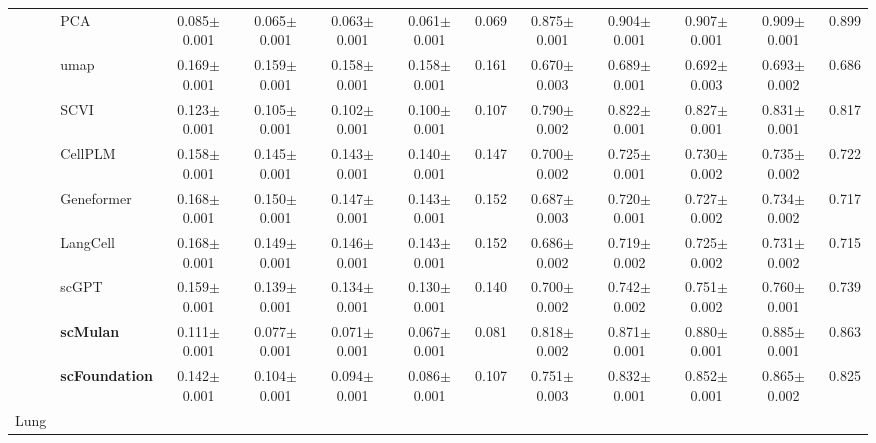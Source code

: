 \begin{table}[htbp]
\begin{tabular}{cl|ccccc|ccccc}
    & PCA      & \cellcolor{gray!25}0.085$\pm$0.001 & \cellcolor{gray!25}0.065$\pm$0.001 & \cellcolor{gray!25}0.063$\pm$0.001 & \cellcolor{gray!25}0.061$\pm$0.001 & \cellcolor{gray!25}0.069      & \cellcolor{gray!25}0.875$\pm$0.001 & \cellcolor{gray!25}0.904$\pm$0.001 & \cellcolor{gray!25}0.907$\pm$0.001 & \cellcolor{gray!25}0.909$\pm$0.001 & \cellcolor{gray!25}0.899 \\
    & umap      & 0.169$\pm$0.001 & 0.159$\pm$0.001 & 0.158$\pm$0.001 & 0.158$\pm$0.001 & 0.161      & 0.670$\pm$0.003 & 0.689$\pm$0.001 & 0.692$\pm$0.003 & 0.693$\pm$0.002 & 0.686 \\
    & SCVI      & 0.123$\pm$0.001 & 0.105$\pm$0.001 & 0.102$\pm$0.001 & 0.100$\pm$0.001 & 0.107      & 0.790$\pm$0.002 & 0.822$\pm$0.001 & 0.827$\pm$0.001 & 0.831$\pm$0.001 & 0.817 \\
    & CellPLM      & 0.158$\pm$0.001 & 0.145$\pm$0.001 & 0.143$\pm$0.001 & 0.140$\pm$0.001 & 0.147      & 0.700$\pm$0.002 & 0.725$\pm$0.001 & 0.730$\pm$0.002 & 0.735$\pm$0.002 & 0.722 \\
    & Geneformer      & 0.168$\pm$0.001 & 0.150$\pm$0.001 & 0.147$\pm$0.001 & 0.143$\pm$0.001 & 0.152      & 0.687$\pm$0.003 & 0.720$\pm$0.001 & 0.727$\pm$0.002 & 0.734$\pm$0.002 & 0.717 \\
    & LangCell      & 0.168$\pm$0.001 & 0.149$\pm$0.001 & 0.146$\pm$0.001 & 0.143$\pm$0.001 & 0.152      & 0.686$\pm$0.002 & 0.719$\pm$0.002 & 0.725$\pm$0.002 & 0.731$\pm$0.002 & 0.715 \\
    & scGPT      & 0.159$\pm$0.001 & 0.139$\pm$0.001 & 0.134$\pm$0.001 & 0.130$\pm$0.001 & 0.140      & 0.700$\pm$0.002 & 0.742$\pm$0.002 & 0.751$\pm$0.002 & 0.760$\pm$0.001 & 0.739 \\
    & \cellcolor{gray!25}\textbf{scMulan}      & 0.111$\pm$0.001 & 0.077$\pm$0.001 & 0.071$\pm$0.001 & 0.067$\pm$0.001 & 0.081      & 0.818$\pm$0.002 & 0.871$\pm$0.001 & 0.880$\pm$0.001 & 0.885$\pm$0.001 & 0.863 \\
    & \cellcolor{gray!25}\textbf{scFoundation}      & 0.142$\pm$0.001 & 0.104$\pm$0.001 & 0.094$\pm$0.001 & 0.086$\pm$0.001 & 0.107      & 0.751$\pm$0.003 & 0.832$\pm$0.001 & 0.852$\pm$0.001 & 0.865$\pm$0.002 & 0.825 \\
    \midrule

    \multirow{9}{*}{Lung}


\end{tabular}
\end{table}
